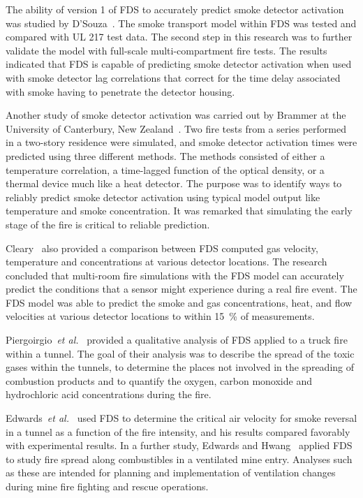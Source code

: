 The ability of  version 1 of FDS to  accurately predict smoke detector activation was studied by D'Souza~\cite{DSouza:1}. The smoke transport model
within FDS  was tested and compared with UL  217 test data.  The second step  in this research was  to further validate  the model with full-scale
multi-compartment fire tests.  The results  indicated that FDS is capable of predicting  smoke detector activation when used with smoke  detector
lag correlations  that  correct  for  the time  delay associated with smoke having to penetrate the detector housing.

Another study of smoke detector  activation was carried out by Brammer at  the University  of Canterbury,  New  Zealand~\cite{Brammer:1}. Two fire
tests from  a series  performed  in a  two-story residence  were simulated, and  smoke detector  activation times were  predicted using three
different methods. The methods consisted of either a temperature correlation,  a time-lagged  function  of the  optical  density, or  a thermal
device much like a heat detector.  The purpose was to identify ways to reliably predict smoke detector activation using typical model output like
temperature and  smoke concentration. It was remarked that simulating  the  early stage  of  the  fire  is critical  to  reliable prediction.

Cleary~\cite{Cleary:1} also provided a comparison between FDS computed gas  velocity,  temperature  and  concentrations at  various  detector
locations.   The research concluded  that multi-room  fire simulations with the FDS model can accurately predict the conditions that a sensor might
experience during a real fire  event.  The FDS model was able to predict the smoke and gas concentrations, heat, and flow velocities at various
detector locations to within 15~\% of measurements.

Piergoirgio~{\em  et al.}~\cite{Piergiorgio:1} provided  a qualitative analysis of FDS applied to a  truck fire within a tunnel.  The goal of their
analysis  was to describe the  spread of the  toxic gases within the tunnels, to determine the  places not involved in the spreading of combustion
products  and to quantify  the oxygen, carbon  monoxide and hydrochloric acid concentrations during the fire.

Edwards~{\em  et al.}~\cite{Edwards:SME2005,Edwards:FSJ}  used  FDS to determine the critical air velocity  for smoke reversal in a tunnel as a
function of  the fire intensity, and his  results compared favorably with   experimental  results.   In  a   further  study,   Edwards  and
Hwang~\cite{Edwards:SME2006}  applied FDS to  study fire  spread along combustibles in  a ventilated mine  entry. Analyses such as  these are
intended for planning and implementation of ventilation changes during mine fire fighting and rescue operations.


